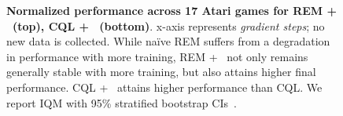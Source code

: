 \begin{figure}[t]
\begin{minipage}{.56\textwidth}
    \vspace{-0.25in}
    \caption{\footnotesize{\textbf{Normalized performance across 17 Atari games for REM + \drmethodname\ (top), CQL + \drmethodname\ (bottom)}. x-axis represents \emph{gradient steps}; no new data is collected. While na\"ive REM suffers from a degradation in performance with more training, REM + \drmethodname\ not only remains generally stable with more training, but also attains higher final performance. CQL + \drmethodname\ attains higher performance than CQL. We report IQM with  95\% stratified bootstrap CIs~\citep{agarwal2021precipice}}.}
    \label{fig:atari_all_combined}
\end{minipage}
\vspace{-0.2cm}
\end{figure}





